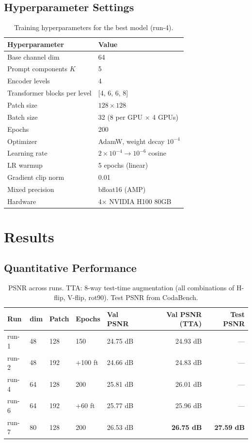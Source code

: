 \documentclass[runningheads]{llncs}
\begin{document}
\subsection{Hyperparameter Settings}

\begin{table}[H]
\centering
\caption{Training hyperparameters for the best model (run-4).}
\label{tab:hparams}
\begin{tabular}{ll}
\toprule
Hyperparameter & Value \\
\midrule
Base channel dim & 64 \\
Prompt components $K$ & 5 \\
Encoder levels & 4 \\
Transformer blocks per level & [4, 6, 6, 8] \\
Patch size & $128 \times 128$ \\
Batch size & 32 (8 per GPU $\times$ 4 GPUs) \\
Epochs & 200 \\
Optimizer & AdamW, weight decay $10^{-4}$ \\
Learning rate & $2\!\times\!10^{-4} \to 10^{-6}$ cosine \\
LR warmup & 5 epochs (linear) \\
Gradient clip norm & 0.01 \\
Mixed precision & bfloat16 (AMP) \\
Hardware & 4$\times$ NVIDIA H100 80GB \\
\bottomrule
\end{tabular}
\end{table}

\section{Results}

\subsection{Quantitative Performance}

\begin{table}[H]
\centering
\caption{PSNR across runs. TTA: 8-way test-time augmentation
(all combinations of H-flip, V-flip, rot90). Test PSNR from CodaBench.}
\label{tab:results}
\begin{tabular}{lllllrr}
\toprule
Run & dim & Patch & Epochs & Val PSNR & Val PSNR (TTA) & Test PSNR \\
\midrule
run-1 & 48 & 128 & 150 & 24.75 dB & 24.93 dB & --- \\
run-2 & 48 & 192 & +100 ft & 24.66 dB & 24.83 dB & --- \\
run-4 & 64 & 128 & 200 & 25.81 dB & 26.01 dB & --- \\
run-6 & 64 & 192 & +60 ft & 25.77 dB & 25.96 dB & --- \\
run-7 & 80 & 128 & 200 & 26.53 dB & \textbf{26.75 dB} & \textbf{27.59 dB} \\
\bottomrule
\end{tabular}
\end{table}
\end{document}
